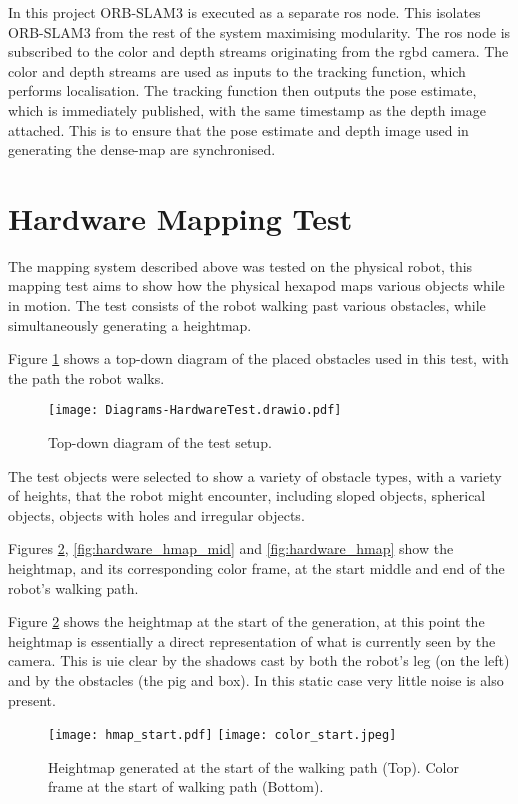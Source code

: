     In this project ORB-SLAM3 is executed as a separate \ac{ros} node. This isolates ORB-SLAM3 from the rest of the system maximising modularity. The \ac{ros} node is subscribed to the color and depth streams originating from the \ac{rgbd} camera. The color and depth streams are used as inputs to the tracking function, which performs localisation. The tracking function then outputs the pose estimate, which is immediately published, with the same timestamp as the depth image attached. This is to ensure that the pose estimate and depth image used in generating the dense-map are synchronised.

    \newpage
    \section{Hardware Mapping Test}\label{sec:hardware_hmap}
        The mapping system described above was tested on the physical robot, this mapping test aims to show how the physical hexapod maps various objects while in motion.
        The test consists of the robot walking past various obstacles, while simultaneously generating a heightmap.

        Figure \ref{fig:hardware_map_diag} shows a top-down diagram of the placed obstacles used in this test, with the path the robot walks.
        \begin{figure}[h]
            \centering
            \texttt{[image: Diagrams-HardwareTest.drawio.pdf]}
            \caption{Top-down diagram of the test setup.}
            \label{fig:hardware_map_diag}
        \end{figure}

        \noindent
        The test objects were selected to show a variety of obstacle types, with a variety of heights, that the robot might encounter, including sloped objects, spherical objects, objects
        with holes and irregular objects. 

        Figures \ref{fig:hardware_hmap_start}, \ref{fig:hardware_hmap_mid} and \ref{fig:hardware_hmap} show the heightmap, and its corresponding color frame, at the start middle and end of the
        robot's walking path.
        
        \newpage
        \noindent
        Figure \ref{fig:hardware_hmap_start} shows the heightmap at the start of the generation, at this point the heightmap is essentially a direct representation of what is
        currently seen by the camera. This is uie clear by the shadows cast by both the robot's leg (on the left) and by the obstacles (the pig and box). In this static case
        very little noise is also present.
        \begin{figure}[h]
            \centering
            \texttt{[image: hmap\_start.pdf]}
            \texttt{[image: color\_start.jpeg]}
            \caption{Heightmap generated at the start of the walking path (Top). Color frame at the start of walking path (Bottom).}
            \label{fig:hardware_hmap_start}
        \end{figure}
        
